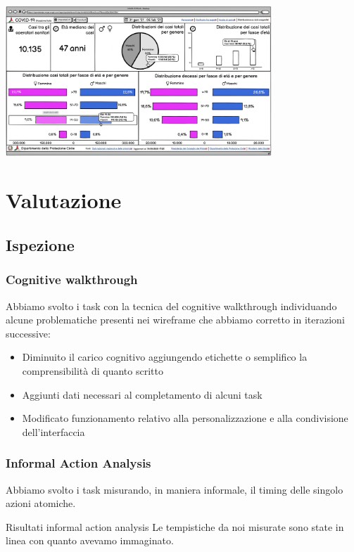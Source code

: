 \documentclass[handout]{beamer}
\begin{document}
		\begin{frame}
			\includegraphics[width=10cm]{img/distribuzione-dati-anagrafici}
		\end{frame}


	\section{Valutazione}
		\subsection{Ispezione}
		\begin{frame}
			\frametitle{Cognitive walkthrough}
			Abbiamo svolto i task con la tecnica del cognitive walkthrough individuando alcune problematiche presenti nei wireframe che abbiamo corretto in iterazioni successive:
			\begin{itemize}[<+->]
				\item Diminuito il carico cognitivo aggiungendo etichette o semplifico la comprensibilità di quanto scritto\\
				\item Aggiunti dati necessari al completamento di alcuni task\\
				\item Modificato funzionamento relativo alla personalizzazione e alla condivisione dell'interfaccia\\
			\end{itemize}
		\end{frame}

		\begin{frame}
			\frametitle{Informal Action Analysis}
			Abbiamo svolto i task misurando, in maniera informale, il timing delle singolo azioni atomiche. \newline \newline
			\begin{block}{Risultati informal action analysis}
			Le tempistiche da noi misurate sono state in linea con quanto avevamo immaginato.
		\end{block}
		\end{frame}
\end{document}
